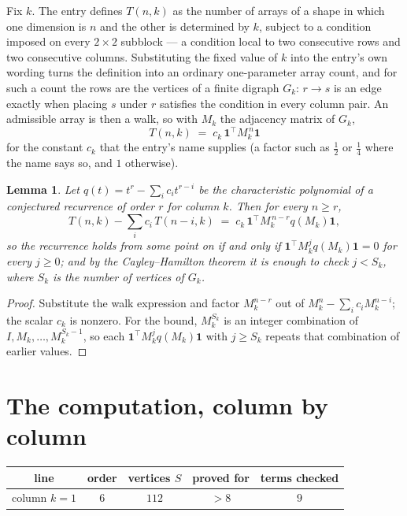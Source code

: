 \documentclass[11pt,a4paper]{article}
\theoremstyle{plain}
\newtheorem{lemma}[theorem]{Lemma}
\theoremstyle{definition}
\begin{document}
Fix $k$. The entry defines $T(n,k)$ as the number of arrays of a shape in which one dimension
is $n$ and the other is determined by $k$, subject to a condition imposed on every
$2\times2$ subblock --- a condition local to two consecutive rows and two consecutive columns.
Substituting the fixed value of $k$ into the entry's own wording turns the definition into an
ordinary one-parameter array count, and for such a count the rows are the vertices of a finite
digraph $G_k$: $r\to s$ is an edge exactly when placing $s$ under $r$ satisfies the condition
in every column pair. An admissible array is then a walk, so with $M_k$ the adjacency matrix
of $G_k$,
\[
T(n,k)\;=\;c_k\,\mathbf{1}^{\!\top}M_k^{\,n}\mathbf{1}
\]
for the constant $c_k$ that the entry's name supplies (a factor such as $\tfrac12$ or
$\tfrac14$ where the name says so, and $1$ otherwise).

\begin{lemma}\label{lem:crit}
Let $q(t)=t^{r}-\sum_i c_it^{r-i}$ be the characteristic polynomial of a conjectured
recurrence of order $r$ for column $k$. Then for every $n\ge r$,
\[
T(n,k)-\sum_i c_i\,T(n-i,k)\;=\;c_k\,\mathbf{1}^{\!\top}M_k^{\,n-r}q(M_k)\mathbf{1},
\]
so the recurrence holds from some point on if and only if
$\mathbf{1}^{\!\top}M_k^{j}q(M_k)\mathbf{1}=0$ for every $j\ge0$; and by the
Cayley--Hamilton theorem it is enough to check $j<S_k$, where $S_k$ is the number of vertices
of $G_k$.
\end{lemma}

\begin{proof}
Substitute the walk expression and factor $M_k^{n-r}$ out of $M_k^{n}-\sum_ic_iM_k^{n-i}$;
the scalar $c_k$ is nonzero. For the bound, $M_k^{S_k}$ is an integer combination of
$I,M_k,\dots,M_k^{S_k-1}$, so each $\mathbf{1}^{\!\top}M_k^{j}q(M_k)\mathbf{1}$ with
$j\ge S_k$ repeats that combination of earlier values.
\end{proof}

\section{The computation, column by column}

\begin{center}
\begin{tabular}{ccccc}
line & order & vertices $S$ & proved for & terms checked \\ \hline
column $k$$=1$ & $6$ & $112$ & $>8$ & $9$ \\
\end{tabular}
\end{center}
\end{document}
